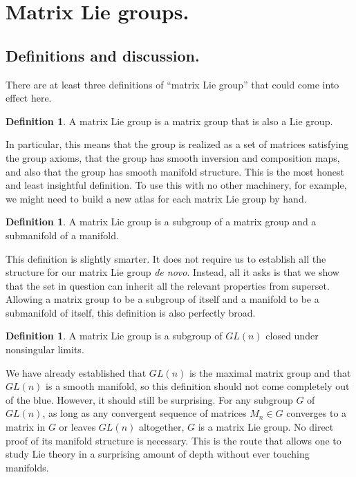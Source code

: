 \documentclass[12pt]{article}
\theoremstyle{definition}
\theoremstyle{definition}
\theoremstyle{definition}
\theoremstyle{definition}
\theoremstyle{definition}
\newtheorem{defn}[them]{Definition}
\theoremstyle{definition}
\theoremstyle{definition}
\theoremstyle{definition}
\begin{document}
\section{Matrix Lie groups.}

\subsection{Definitions and discussion.}

\par{There are at least three definitions of
“matrix Lie group” that could come into effect
here.}

\begin{defn}\label{def1} A matrix Lie group is a
matrix group that is also a Lie group.\end{defn}
\par{In particular, this means that the group is
realized as a set of matrices satisfying the group
axioms, that the group has smooth inversion and
composition maps, and also that the group has
smooth manifold structure. This is the most honest
and least insightful definition. To use this with
no other machinery, for example, we might need to
build a new atlas for each matrix Lie group by
hand.}

\begin{defn}\label{def2} A matrix Lie
group is a subgroup of a matrix group and a
submanifold of a manifold.
\end{defn} 
\par{This definition is slightly smarter. It does
not require us to establish all the structure for
our matrix Lie group \textit{de novo}. Instead,
all it asks is that we show that the set in
question can inherit all the relevant properties
from superset. Allowing a matrix group to be a
subgroup of itself and a manifold to be a
submanifold of itself, this definition is also
perfectly broad.}

\begin{defn}\label{def3} A matrix Lie
group is a subgroup of $GL(n)$ closed under
nonsingular limits.
\end{defn}
\par{We have already established
that $GL(n)$ is the maximal matrix group and that
$GL(n)$ is a smooth manifold, so this definition should
not come completely out of the blue. However, it
should still be surprising. For any subgroup $G$ of
$GL(n)$, as long as any convergent sequence of
matrices $M_n \in G$ converges to a matrix in $G$
or leaves $GL(n)$ altogether, $G$ is a matrix Lie
group. No direct proof of its manifold structure
is necessary. This is the route that allows one to
study Lie theory in a surprising amount of depth
without ever touching manifolds.}
\end{document}
